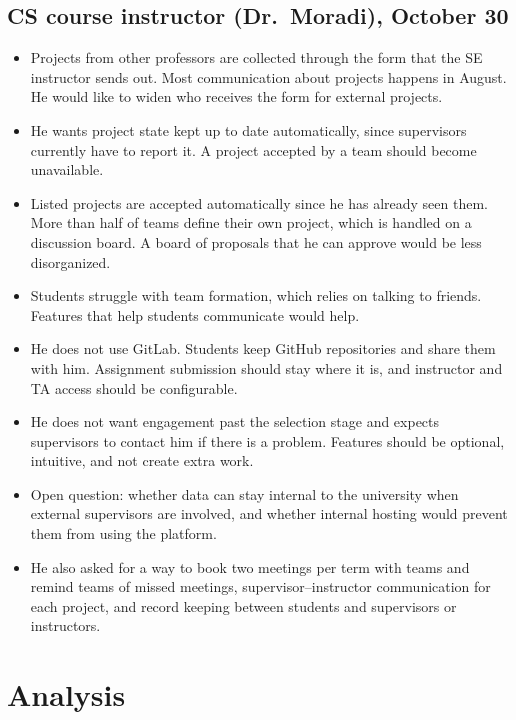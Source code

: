 \documentclass{article}
\begin{document}
    \subsection{CS course instructor (Dr.~Moradi), October 30}
    \label{int:CI-1}

    \begin{itemize}
        \item Projects from other professors are collected through the form that the SE instructor sends out.
        Most communication about projects happens in August. He would like to widen who receives the form
        for external projects.
        \item He wants project state kept up to date automatically, since supervisors currently have to report it.
        A project accepted by a team should become unavailable.
        \item Listed projects are accepted automatically since he has already seen them. More than half of teams
        define their own project, which is handled on a discussion board. A board of proposals that he can approve
        would be less disorganized.
        \item Students struggle with team formation, which relies on talking to friends. Features that help students
        communicate would help.
        \item He does not use GitLab. Students keep GitHub repositories and share them with him. Assignment submission
        should stay where it is, and instructor and TA access should be configurable.
        \item He does not want engagement past the selection stage and expects supervisors to contact him if there
        is a problem. Features should be optional, intuitive, and not create extra work.
        \item Open question: whether data can stay internal to the university when external supervisors are involved,
        and whether internal hosting would prevent them from using the platform.
        \item He also asked for a way to book two meetings per term with teams and remind teams of missed meetings,
        supervisor--instructor communication for each project, and record keeping between students and supervisors
        or instructors.
    \end{itemize}

    \section{Analysis}
\end{document}
